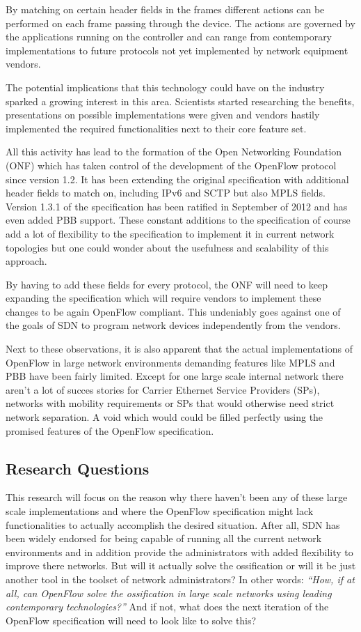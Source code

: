 \documentclass[oneside,twocolumn,7pt,a4paper]{article}
\begin{document}
	By matching on certain header fields in the frames different actions can be performed on each frame passing through the device. The actions are governed by the applications running on the controller and can range from contemporary implementations to future protocols not yet implemented by network equipment vendors.
	
	The potential implications that this technology could have on the industry sparked a growing interest in this area. Scientists started researching the benefits, presentations on possible implementations were given and vendors hastily implemented the required functionalities next to their core feature set.
	
	All this activity has lead to the formation of the Open Networking Foundation (ONF) which has taken control of the development of the OpenFlow protocol since version 1.2. It has been extending the original specification with additional header fields to match on, including IPv6 and SCTP but also MPLS fields. Version 1.3.1 \cite{onf} of the specification has been ratified in September of 2012 and has even added PBB support. These constant additions to the specification of course add a lot of flexibility to the specification to implement it in current network topologies but one could wonder about the usefulness and scalability of this approach.
	
	By having to add these fields for every protocol, the ONF will need to keep expanding the specification which will require vendors to implement these changes to be again OpenFlow compliant. This undeniably goes against one of the goals of SDN to program network devices independently from the vendors. 
	
	Next to these observations, it is also apparent that the actual implementations of OpenFlow in large network environments demanding features like MPLS and PBB have been fairly limited. Except for one large scale internal network \cite{googleonf} there aren't a lot of succes stories for Carrier Ethernet Service Providers (SPs), networks with mobility requirements or SPs that would otherwise need strict network separation. A void which would could be filled perfectly using the promised features of the OpenFlow specification.
			
		\subsection*{Research Questions} %
		\label{sub:research_questions}
		This research will focus on the reason why there haven't been any of these large scale implementations and where the OpenFlow specification might lack functionalities to actually accomplish the desired situation. After all, SDN has been widely endorsed for being capable of running all the current network environments and in addition provide the administrators with added flexibility to improve there networks. But will it actually solve the ossification or will it be just another tool in the toolset of network administrators? In other words:	\textsl{``How, if at all, can OpenFlow solve the ossification in large scale networks using leading contemporary technologies?''} And if not, what does the next iteration of the OpenFlow specification will need to look like to solve this?
\end{document}
